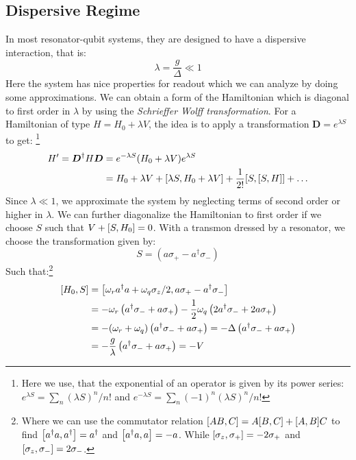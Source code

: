 \subsection{Dispersive Regime}
In most resonator-qubit systems, they are designed to have a dispersive interaction, that is:
\begin{equation}
    \lambda = \frac{g}{\Delta} \ll 1
\end{equation}
Here the system has nice properties for readout which we can analyze by doing some approximations. We can obtain a form of the Hamiltonian which is diagonal to first order in $\lambda$ by using the \textit{Schrieffer Wolff transformation}. For a Hamiltonian of type $H = H_0 + \lambda V$, the idea is to apply a transformation $\boldsymbol{D} = e^{\lambda S}$ to get: \footnote{Here we use, that the exponential of an operator is given by its power series: $e^{\lambda S} = \sum_n (\lambda S)^n / n!$ and $e^{-\lambda  S} = \sum_n (-1)^n (\lambda S)^n / n!$}
\begin{align*}
    H' = \boldsymbol{D}^\dagger H \boldsymbol{D} &= e^{-\lambda S} (H_0 + \lambda V) e^{\lambda  S} \\
    &= H_0 + \lambda V + \comm{\lambda S}{H_0 + \lambda V} + \frac{1}{2!} \comm{S}{\comm{S}{H}} + \dots
\end{align*}
Since $\lambda \ll 1$, we approximate the system by neglecting terms of second order or higher in $\lambda$. We can further diagonalize the Hamiltonian to first order if we choose $S$ such that $V + \comm{S}{H_0} = 0$. With a transmon dressed by a resonator, we choose the transformation given by:
\begin{equation}
    S = (a \sigma_+ - a^\dagger \sigma_-)
\end{equation}
Such that:\footnote{Where we can use the commutator relation $\comm{AB}{C} = A\comm{B}{C} + \comm{A}{B}C$ to find $\comm{a^\dagger a}{a^\dagger} = a^\dagger$ and $\comm{a^\dagger a}{a} = - a$. While $\comm{\sigma_z}{\sigma_+} = -2\sigma_+$ and $\comm{\sigma_z}{\sigma_-} = 2\sigma_-$.}
\begin{align*}
    \comm{H_0}{S} &= \comm{\omega_r a^\dagger a + \omega_q \sigma_z / 2}{a \sigma_+ - a^\dagger \sigma_-} \\
    &= - \omega_r \left(a^\dagger \sigma_- + a \sigma_+\right) - \frac12 \omega_q \left(2a^\dagger \sigma_- + 2 a \sigma_+ \right) \\
    &= -  (\omega_r + \omega_q)\left(a^\dagger \sigma_- + a \sigma_+\right) = - \Delta \left(a^\dagger \sigma_- + a \sigma_+\right) \\
    &= - \frac{g}{\lambda} \left(a^\dagger \sigma_- + a \sigma_+\right) = - V 
\end{align*}
